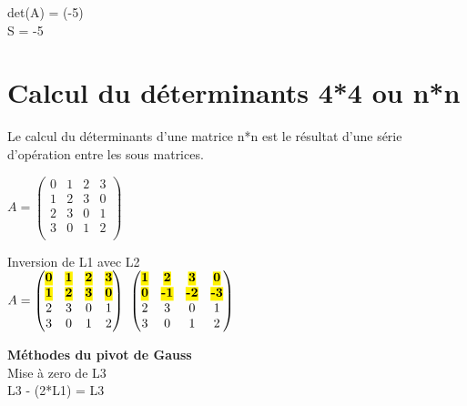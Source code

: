 det(A) = (-5)\\

S = -5\\

\section{Calcul du déterminants 4*4 ou n*n}
\vspace{5mm} %
Le calcul du déterminants d'une matrice n*n est le résultat d'une série d'opération entre les sous matrices.
\vspace{5mm} %

$
A =
\begin{pmatrix}
  0 & 1 & 2 & 3 \\
  1 & 2 & 3 & 0 \\
  2 & 3 & 0 & 1 \\
  3 & 0 & 1 & 2 \\
\end{pmatrix}
$

\vspace{10mm} %
Inversion de L1 avec L2\\

$
A =
\begin{pmatrix}
  \hl{\textbf{0}} & \hl{\textbf{1}} & \hl{\textbf{2}} & \hl{\textbf{3}} \\
  \hl{\textbf{1}} & \hl{\textbf{2}} & \hl{\textbf{3}} & \hl{\textbf{0}} \\
  2 & 3 & 0 & 1 \\
  3 & 0 & 1 & 2 \\
\end{pmatrix}
$
\vspace{5mm} %
$
\begin{pmatrix}
  \hl{\textbf{1}} & \hl{\textbf{2}} & \hl{\textbf{3}} & \hl{\textbf{0}} \\
  \hl{\textbf{0}} & \hl{\textbf{-1}} & \hl{\textbf{-2}} & \hl{\textbf{-3}} \\
  2 & 3 & 0 & 1 \\
  3 & 0 & 1 & 2 \\
\end{pmatrix}
$

\vspace{5mm} %
\textbf{Méthodes du pivot de Gauss} \\

Mise à zero de L3 \\
L3 - (2*L1) = L3 \\
\vspace{2mm}

